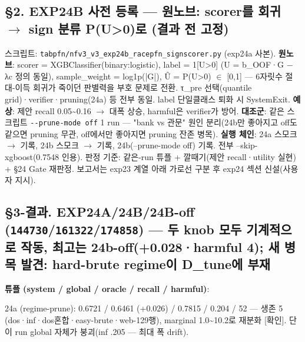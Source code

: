 \subsection{§2. EXP24B 사전 등록 — 원노브: scorer를 회귀  \ensuremath{\rightarrow}  sign 분류 P(U>0)로 (결과 전 고정)}
스크립트: \texttt{tabpfn/\allowbreak{}\allowbreak{}n\allowbreak{}fv3\_\allowbreak{}\allowbreak{}v3\_\allowbreak{}\allowbreak{}e\allowbreak{}xp24b\_\allowbreak{}\allowbreak{}ra\allowbreak{}cepfn\_\allowbreak{}\allowbreak{}si\allowbreak{}gnscorer\allowbreak{}.\allowbreak{}py} (exp24a 사본). \textbf{원노브}: scorer =\allowbreak{} XGBClassifier(binary:logistic), label =\allowbreak{} 1[U>0] (U =\allowbreak{} b\_\allowbreak{}OOF·G − λc 정의 동일), sample\_\allowbreak{}weight =\allowbreak{} log1p(|G|), Û =\allowbreak{} P(U>0) \ensuremath{\in} [0,1] — 6자릿수 절대-이득 회귀가 죽이던 판별력을 부호 문제로 전환. τ\_\allowbreak{}pre 선택(quantile grid)·verifier·pruning(24a) 등 전부 동일. label 단일클래스 퇴화 시 SystemExit. \textbf{예상}: 제안 recall 0.05\textasciitilde{}0.16  \ensuremath{\rightarrow}  대폭 상승, harmful은 verifier가 방어. \textbf{대조군}: 같은 스크립트 \texttt{-\allowbreak{}-\allowbreak{}prune-\allowbreak{}mode off\allowbreak{}} 1 run — "bank vs 관문" 원인 분리(24b만 좋아지고 off도 같으면 pruning 무관, off에서만 좋아지면 pruning 잔존 병목). \textbf{실행 체인}: 24a 스모크 \ensuremath{\rightarrow} 기록, 24b 스모크 \ensuremath{\rightarrow} 기록, 24b(--prune-mode off) 기록. 전부 --skip-xgboost(0.7548 인용). 판정 기준: 같은-run 튜플 +\allowbreak{} 깔때기(제안 recall·utility 실현) +\allowbreak{} §24 Gate 재판정. 보고서는 exp23 계열 아래 가로선 구분 후 exp24 섹션 신설(사용자 지시).

\subsection{§3-결과. EXP24A/\allowbreak{}24B/\allowbreak{}24B-off (\texttt{144730}/\allowbreak{}\texttt{161322}/\allowbreak{}\texttt{174858}) — 두 knob 모두 기계적으로 작동, 최고는 24b-off(+\allowbreak{}0.028·harmful 4); 새 병목 발견: hard-brute regime이 D\_\allowbreak{}tune에 부재}
\textbf{튜플 (system /\allowbreak{} global /\allowbreak{} oracle /\allowbreak{} recall /\allowbreak{} harmful)}:

\par\noindent \textbullet\enspace 24a (regime-prune): 0.6721 /\allowbreak{} 0.6461 (+\allowbreak{}0.026) /\allowbreak{} 0.7815 /\allowbreak{} 0.204 /\allowbreak{} 52 — 생존 5 (dos·inf·dos혼합·easy-brute·web-129행), marginal 1.0\textasciitilde{}10.2로 재분화 [확인]. 단 이 run global 자체가 붕괴(inf .205 — 최대 폭 drift).


